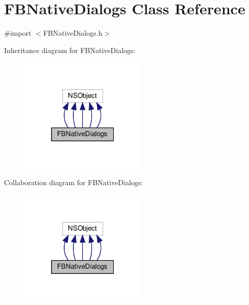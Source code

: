 \hypertarget{interfaceFBNativeDialogs}{}\section{F\+B\+Native\+Dialogs Class Reference}
\label{interfaceFBNativeDialogs}


{\ttfamily \#import $<$F\+B\+Native\+Dialogs.\+h$>$}



Inheritance diagram for F\+B\+Native\+Dialogs\+:
\nopagebreak
\begin{figure}[H]
\begin{center}
\leavevmode
\includegraphics[width=171pt]{interfaceFBNativeDialogs__inherit__graph}
\end{center}
\end{figure}


Collaboration diagram for F\+B\+Native\+Dialogs\+:
\nopagebreak
\begin{figure}[H]
\begin{center}
\leavevmode
\includegraphics[width=171pt]{interfaceFBNativeDialogs__coll__graph}
\end{center}
\end{figure}
